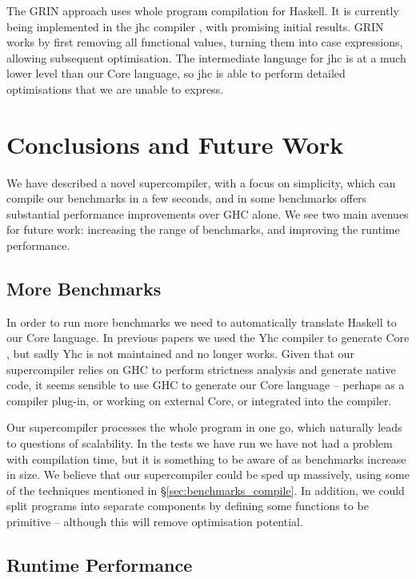 \documentclass[draft]{sigplanconf}
\begin{document}
The GRIN approach \cite{grin} uses whole program compilation for Haskell. It is currently being implemented in the jhc compiler \cite{jhc}, with promising initial results. GRIN works by first removing all functional values, turning them into case expressions, allowing subsequent optimisation. The intermediate language for jhc is at a much lower level than our Core language, so jhc is able to perform detailed optimisations that we are unable to express.

\section{Conclusions and Future Work}

We have described a novel supercompiler, with a focus on simplicity, which can compile our benchmarks in a few seconds, and in some benchmarks offers substantial performance improvements over GHC alone. We see two main avenues for future work: increasing the range of benchmarks, and improving the runtime performance.

\subsection{More Benchmarks}

In order to run more benchmarks we need to automatically translate Haskell to our Core language. In previous papers we used the Yhc compiler to generate Core \cite{me:yhc_core}, but sadly Yhc is not maintained and no longer works. Given that our supercompiler relies on GHC to perform strictness analysis and generate native code, it seems sensible to use GHC to generate our Core language -- perhaps as a compiler plug-in, or working on external Core, or integrated into the compiler.

Our supercompiler processes the whole program in one go, which naturally leads to questions of scalability. In the tests we have run we have not had a problem with compilation time, but it is something to be aware of as benchmarks increase in size. We believe that our supercompiler could be sped up massively, using some of the techniques mentioned in \S\ref{sec:benchmarks_compile}. In addition, we could split programs into separate components by defining some functions to be primitive -- although this will remove optimisation potential.

\subsection{Runtime Performance}
\end{document}
